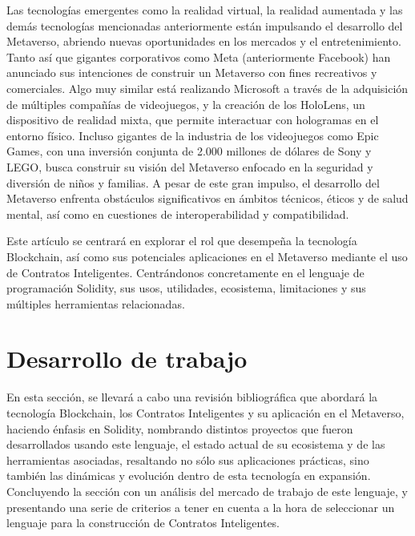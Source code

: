 \documentclass[a4paper,10pt]{article}
\begin{document}
	Las tecnologías emergentes como la realidad virtual, la realidad aumentada y las demás tecnologías mencionadas anteriormente están impulsando el desarrollo del Metaverso, abriendo nuevas oportunidades en los mercados y el entretenimiento. Tanto así que gigantes corporativos como Meta (anteriormente Facebook) han anunciado sus intenciones de construir un Metaverso con fines recreativos y comerciales. Algo muy similar está realizando Microsoft a través de la adquisición de múltiples compañías de videojuegos, y la creación de los HoloLens, un dispositivo de realidad mixta, que permite interactuar con hologramas en el entorno físico. Incluso gigantes de la industria de los videojuegos como Epic Games, con una inversión conjunta de 2.000 millones de dólares de Sony y LEGO, busca construir su visión del Metaverso enfocado en la seguridad y diversión de niños y familias. A pesar de este gran impulso, el desarrollo del Metaverso enfrenta obstáculos significativos en ámbitos técnicos, éticos y de salud mental, así como en cuestiones de interoperabilidad y compatibilidad. 
	
	Este artículo se centrará en explorar el rol que desempeña la tecnología Blockchain, así como sus potenciales aplicaciones en el Metaverso mediante el uso de Contratos Inteligentes. Centrándonos concretamente en el lenguaje de programación Solidity, sus usos, utilidades, ecosistema, limitaciones y sus múltiples herramientas relacionadas.
	\section{Desarrollo de trabajo}
	En esta sección, se llevará a cabo una revisión bibliográfica que abordará la tecnología Blockchain, los Contratos Inteligentes y su aplicación en el Metaverso, haciendo énfasis en Solidity, nombrando distintos proyectos que fueron desarrollados usando este lenguaje, el estado actual de su ecosistema y de las herramientas asociadas, resaltando no sólo sus aplicaciones prácticas, sino también las dinámicas y evolución dentro de esta tecnología en expansión. Concluyendo la sección con un análisis del mercado de trabajo de este lenguaje, y presentando una serie de criterios a tener en cuenta a la hora de seleccionar un lenguaje para la construcción de Contratos Inteligentes.
	
\end{document}
